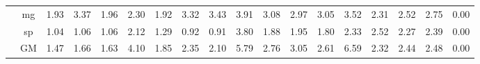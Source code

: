 \begin{table*}[]
\begin{center}
{\begin{tabular}{|c|c|rrrr|rrrr|rrrr|rrrr|}
 &  mg  &  1.93  &  3.37  & \cellcolor{blue!25} 1.96  &   2.30  &  1.92  &  3.32  &  3.43  &   3.91  &  3.08  & \cellcolor{blue!25} 2.97  &  3.05  &   3.52  &  2.31  &  2.52  &  2.75  &  0.00 \\
 &  sp  &  1.04  &  1.06  &  1.06  &   2.12  &  1.29  & \cellcolor{blue!25} 0.92  & \cellcolor{blue!25} 0.91  &   3.80  &  1.88  &  1.95  & \cellcolor{blue!25} 1.80  &   2.33  &  2.52  & \cellcolor{blue!25} 2.27  &  2.39  &  0.00 \\ \cline{2-18}
 &  GM  &  1.47  &  1.66  & \cellcolor{blue!25} 1.63  &   4.10  &  1.85  &  2.35  & \cellcolor{blue!25} 2.10  &   5.79  &  2.76  &  3.05  & \cellcolor{blue!25} 2.61  &   6.59  &  2.32  &  2.44  &  2.48  &  0.00 \\
\hline 
\end{tabular} }

\end{center}
\end{table*}
